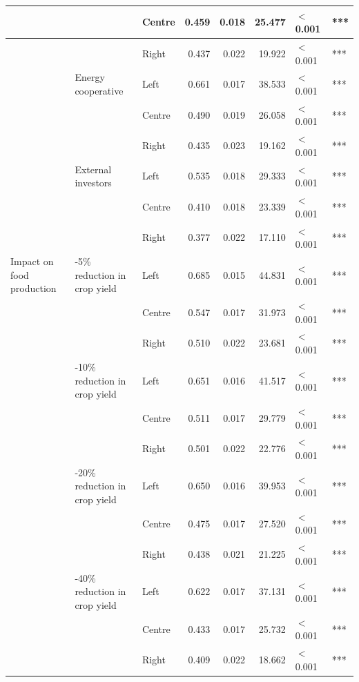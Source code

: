 \begin{longtable}[t]{>{\raggedright\arraybackslash}p{4cm}>{\raggedright\arraybackslash}p{4cm}>{\raggedright\arraybackslash}p{2.5cm}rrrll}
 &  & Centre & 0.459 & 0.018 & 25.477 & $<$0.001 & ***\\
\cmidrule{3-8}\nopagebreak
 &  & Right & 0.437 & 0.022 & 19.922 & $<$0.001 & ***\\
\cmidrule{2-8}\nopagebreak
 & Energy cooperative & Left & 0.661 & 0.017 & 38.533 & $<$0.001 & ***\\
\cmidrule{3-8}\nopagebreak
 &  & Centre & 0.490 & 0.019 & 26.058 & $<$0.001 & ***\\
\cmidrule{3-8}\nopagebreak
 &  & Right & 0.435 & 0.023 & 19.162 & $<$0.001 & ***\\
\cmidrule{2-8}\nopagebreak
 & External investors & Left & 0.535 & 0.018 & 29.333 & $<$0.001 & ***\\
\cmidrule{3-8}\nopagebreak
 &  & Centre & 0.410 & 0.018 & 23.339 & $<$0.001 & ***\\
\cmidrule{3-8}\nopagebreak
 &  & Right & 0.377 & 0.022 & 17.110 & $<$0.001 & ***\\
\cmidrule{1-8}\pagebreak[0]
Impact on food production & 0-5\% reduction in crop yield & Left & 0.685 & 0.015 & 44.831 & $<$0.001 & ***\\
\cmidrule{3-8}\nopagebreak
 &  & Centre & 0.547 & 0.017 & 31.973 & $<$0.001 & ***\\
\cmidrule{3-8}\nopagebreak
 &  & Right & 0.510 & 0.022 & 23.681 & $<$0.001 & ***\\
\cmidrule{2-8}\nopagebreak
 & 6-10\% reduction in crop yield & Left & 0.651 & 0.016 & 41.517 & $<$0.001 & ***\\
\cmidrule{3-8}\nopagebreak
 &  & Centre & 0.511 & 0.017 & 29.779 & $<$0.001 & ***\\
\cmidrule{3-8}\nopagebreak
 &  & Right & 0.501 & 0.022 & 22.776 & $<$0.001 & ***\\
\cmidrule{2-8}\nopagebreak
 & 11-20\% reduction in crop yield & Left & 0.650 & 0.016 & 39.953 & $<$0.001 & ***\\
\cmidrule{3-8}\nopagebreak
 &  & Centre & 0.475 & 0.017 & 27.520 & $<$0.001 & ***\\
\cmidrule{3-8}\nopagebreak
 &  & Right & 0.438 & 0.021 & 21.225 & $<$0.001 & ***\\
\cmidrule{2-8}\nopagebreak
 & 21-40\% reduction in crop yield & Left & 0.622 & 0.017 & 37.131 & $<$0.001 & ***\\
\cmidrule{3-8}\nopagebreak
 &  & Centre & 0.433 & 0.017 & 25.732 & $<$0.001 & ***\\
\cmidrule{3-8}\nopagebreak
 &  & Right & 0.409 & 0.022 & 18.662 & $<$0.001 & ***\\

\end{longtable}
